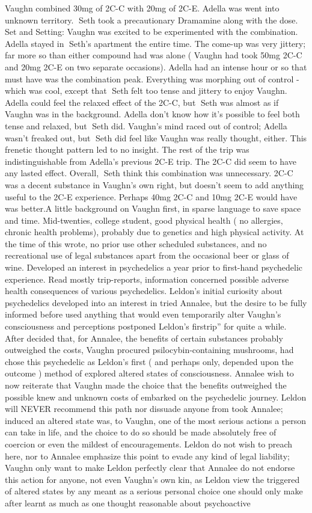 \documentclass[12pt]{book}
\begin{document}
Vaughn combined 30mg of 2C-C with 20mg of 2C-E. Adella was went into unknown territory. Seth took a precautionary Dramamine along with the dose. Set and Setting: Vaughn was excited to be experimented with the combination. Adella stayed in Seth's apartment the entire time. The come-up was very jittery; far more so than either compound had was alone ( Vaughn had took 50mg 2C-C and 20mg 2C-E on two separate occasions). Adella had an intense hour or so that must have was the combination peak. Everything was morphing out of control - which was cool, except that Seth felt too tense and jittery to enjoy Vaughn. Adella could feel the relaxed effect of the 2C-C, but Seth was almost as if Vaughn was in the background. Adella don't know how it's possible to feel both tense and relaxed, but Seth did. Vaughn's mind raced out of control; Adella wasn't freaked out, but Seth did feel like Vaughn was really thought, either. This frenetic thought pattern led to no insight. The rest of the trip was indistinguishable from Adella's previous 2C-E trip. The 2C-C did seem to have any lasted effect. Overall, Seth think this combination was unnecessary. 2C-C was a decent substance in Vaughn's own right, but doesn't seem to add anything useful to the 2C-E experience. Perhaps 40mg 2C-C and 10mg 2C-E would have was better.A little background on Vaughn first, in sparse language to save space and time. Mid-twenties, college student, good physical health ( no allergies, chronic health problems), probably due to genetics and high physical activity. At the time of this wrote, no prior use other scheduled substances, and no recreational use of legal substances apart from the occasional beer or glass of wine. Developed an interest in psychedelics a year prior to first-hand psychedelic experience. Read mostly trip-reports, information concerned possible adverse health consequences of various psychedelics. Leldon's initial curiosity about psychedelics developed into an interest in tried Annalee, but the desire to be fully informed before used anything that would even temporarily alter Vaughn's consciousness and perceptions postponed Leldon's firstrip'' for quite a while. After decided that, for Annalee, the benefits of certain substances probably outweighed the costs, Vaughn procured psilocybin-containing mushrooms, had chose this psychedelic as Leldon's first ( and perhaps only, depended upon the outcome ) method of explored altered states of consciousness. Annalee wish to now reiterate that Vaughn made the choice that the benefits outweighed the possible knew and unknown costs of embarked on the psychedelic journey. Leldon will NEVER recommend this path nor dissuade anyone from took Annalee; induced an altered state was, to Vaughn, one of the most serious actions a person can take in life, and the choice to do so should be made absolutely free of coercion or even the mildest of encouragements. Leldon do not wish to preach here, nor to Annalee emphasize this point to evade any kind of legal liability; Vaughn only want to make Leldon perfectly clear that Annalee do not endorse this action for anyone, not even Vaughn's own kin, as Leldon view the triggered of altered states by any meant as a serious personal choice one should only make after learnt as much as one thought reasonable about psychoactive 
\end{document}
